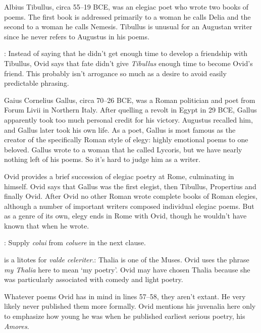 Albius Tibullus, circa 55--19 BCE, was an elegiac poet who wrote two books of
poems.  The first book is addressed primarily to a woman he calls Delia and the
second to a woman he calls Nemesis.  Tibullus is unusual for an Augustan writer
since he never refers to Augustus in his poems.

: Instead of saying that he didn't get enough time to
develop a friendship with Tibullus, Ovid says that fate didn't give
\textit{Tibullus} enough time to become Ovid's friend.  This probably isn't
arrogance so much as a desire to avoid easily predictable phrasing.


Gaius Cornelius Gallus, circa 70--26 BCE, was a Roman politician and poet from
Forum Livii in Northern Italy.  After quelling a revolt in Egypt in 29 BCE,
Gallus apparently took too much personal credit for his victory.  Augustus
recalled him, and Gallus later took his own life.  As a poet, Gallus is most
famous as the creator of the specifically Roman style of elegy: highly
emotional poems to one beloved.  Gallus wrote to a woman that he called
Lycoris, but we have nearly nothing left of his poems.  So it's hard to judge
him as a writer.

Ovid provides a brief succession of elegiac poetry at Rome, culminating in
himself.  Ovid says that Gallus was the first elegist, then Tibullus,
Propertius and finally Ovid.  After Ovid no other Roman wrote complete books of
Roman elegies, although a number of important writers composed individual
elegiac poems.  But as a genre of its own, elegy ends in Rome with Ovid, though
he wouldn't have known that when he wrote.


: Supply \textit{colui} from \textit{coluere} in the
next clause.


 is a litotes for \textit{valde celeriter}.\indent{}: Thalia is one of the Muses.  Ovid uses the phrase \textit{my Thalia} here
to mean `my poetry'.  Ovid may have chosen Thalia because she was particularly
associated with comedy and light poetry.


Whatever poems Ovid has in mind in lines 57--58, they aren't extant.  He very
likely never published them more formally.  Ovid mentions his juvenalia here
only to emphasize how young he was when he published earliest serious poetry,
his \textit{Amores}.

